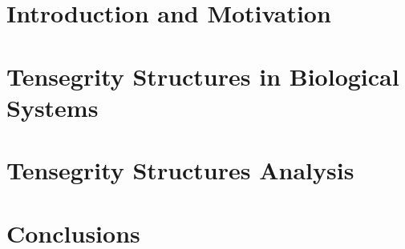 % 
%
%
% 
   	\section{Introduction and Motivation}
		

	\section{Tensegrity Structures in Biological Systems}
		

    \section{Tensegrity Structures Analysis}
		

	\section{Conclusions}
		


